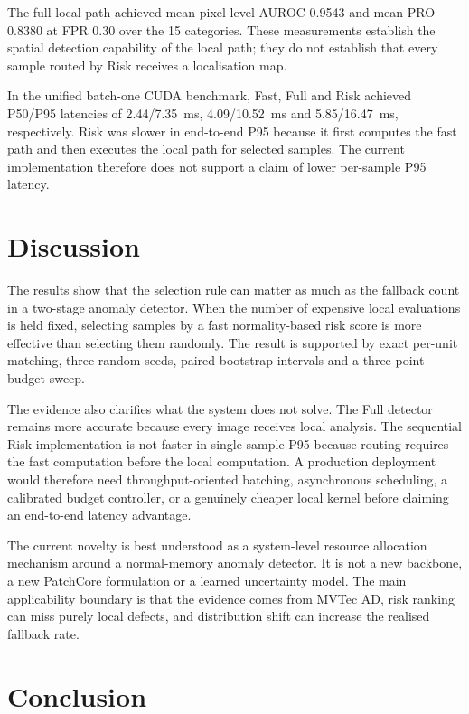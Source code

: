 \documentclass[preprint,12pt]{elsarticle}
\begin{document}
The full local path achieved mean pixel-level AUROC 0.9543 and mean PRO 0.8380 at FPR 0.30 over the 15 categories. These measurements establish the spatial detection capability of the local path; they do not establish that every sample routed by Risk receives a localisation map.

In the unified batch-one CUDA benchmark, Fast, Full and Risk achieved P50/P95 latencies of 2.44/7.35~ms, 4.09/10.52~ms and 5.85/16.47~ms, respectively. Risk was slower in end-to-end P95 because it first computes the fast path and then executes the local path for selected samples. The current implementation therefore does not support a claim of lower per-sample P95 latency.

\section{Discussion}

The results show that the selection rule can matter as much as the fallback count in a two-stage anomaly detector. When the number of expensive local evaluations is held fixed, selecting samples by a fast normality-based risk score is more effective than selecting them randomly. The result is supported by exact per-unit matching, three random seeds, paired bootstrap intervals and a three-point budget sweep.

The evidence also clarifies what the system does not solve. The Full detector remains more accurate because every image receives local analysis. The sequential Risk implementation is not faster in single-sample P95 because routing requires the fast computation before the local computation. A production deployment would therefore need throughput-oriented batching, asynchronous scheduling, a calibrated budget controller, or a genuinely cheaper local kernel before claiming an end-to-end latency advantage.

The current novelty is best understood as a system-level resource allocation mechanism around a normal-memory anomaly detector. It is not a new backbone, a new PatchCore formulation or a learned uncertainty model. The main applicability boundary is that the evidence comes from MVTec AD, risk ranking can miss purely local defects, and distribution shift can increase the realised fallback rate.

\section{Conclusion}
\end{document}
